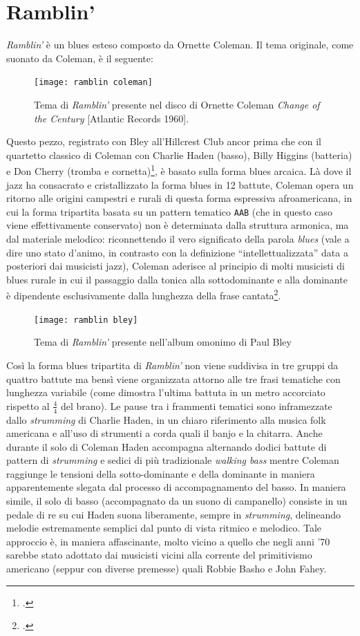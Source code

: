 \section{Ramblin'}
\textit{Ramblin'} è un blues esteso composto da Ornette Coleman. Il tema originale, come suonato da Coleman, è il seguente:
 \begin{figure}[H]
	\centering
	\texttt{[image: ramblin coleman]}
	\caption{Tema di \textit{Ramblin'} presente nel disco di Ornette Coleman \textit{Change of the Century} [Atlantic Records 1960].}
	\label{ramblcol}
\end{figure}
Questo pezzo, registrato con Bley all'Hillcrest Club ancor prima che con il quartetto classico di Coleman con Charlie Haden (basso), Billy Higgins (batteria) e Don Cherry (tromba e cornetta)\footcite[71]{litweiler}, è basato sulla forma blues arcaica. Là dove il jazz ha consacrato e cristallizzato la forma blues in 12 battute, Coleman opera un ritorno alle origini campestri e rurali di questa forma espressiva afroamericana, in cui la forma tripartita basata su un pattern tematico \verb*|AAB| (che in questo caso viene effettivamente conservato) non è determinata dalla struttura armonica, ma dal materiale melodico: riconnettendo il vero significato della parola \textit{blues} (vale a dire uno stato d'animo, in contrasto con la definizione ``intellettualizzata'' data a posteriori dai musicisti jazz), Coleman aderisce al principio di molti musicisti di blues rurale in cui il passaggio dalla tonica alla sottodominante e alla dominante è dipendente esclusivamente dalla lunghezza della frase cantata\footcite[38]{Cogswell1989}.\par
 \begin{figure}[h]
	\centering
	\texttt{[image: ramblin bley]}
	\caption{Tema di \textit{Ramblin'} presente nell'album omonimo di Paul Bley}
	\label{ramblbley}
\end{figure}
Così la forma blues tripartita di \textit{Ramblin'} non viene suddivisa in tre gruppi da quattro battute ma bensì viene organizzata attorno alle tre frasi tematiche con lunghezza variabile (come dimostra l'ultima battuta in un metro accorciato rispetto al $\frac{4}{4}$ del brano). Le pause tra i frammenti tematici sono inframezzate dallo \textit{strumming} di Charlie Haden, in un chiaro riferimento alla musica folk americana e all'uso di strumenti a corda quali il banjo e la chitarra. Anche durante il solo di Coleman Haden accompagna alternando dodici battute di pattern di \textit{strumming} e sedici di più tradizionale \textit{walking bass} mentre Coleman raggiunge le tensioni della sotto-dominante e della dominante in maniera apparentemente slegata dal processo di accompagnamento del basso. In maniera simile, il solo di basso (accompagnato da un suono di campanello) consiste in un pedale di re su cui Haden suona liberamente, sempre in \textit{strumming}, delineando melodie estremamente semplici dal punto di vista ritmico e melodico. Tale approccio è, in maniera affascinante, molto vicino a quello che negli anni '70 sarebbe stato adottato dai musicisti vicini alla corrente del primitivismo americano (seppur con diverse premesse) quali Robbie Basho e John Fahey.\par
